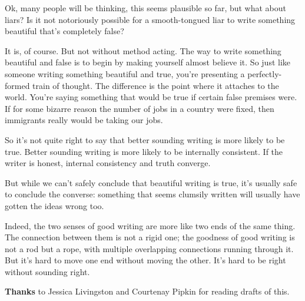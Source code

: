 Ok, many people will be thinking, this seems plausible so far, but what
about liars? Is it not notoriously possible for a smooth-tongued liar to
write something beautiful that's completely false?

It is, of course. But not without method acting. The way to write
something beautiful and false is to begin by making yourself almost
believe it. So just like someone writing something beautiful and true,
you're presenting a perfectly-formed train of thought. The difference is
the point where it attaches to the world. You're saying something that
would be true if certain false premises were. If for some bizarre reason
the number of jobs in a country were fixed, then immigrants really would
be taking our jobs.

So it's not quite right to say that better sounding writing is more
likely to be true. Better sounding writing is more likely to be
internally consistent. If the writer is honest, internal consistency and
truth converge.

But while we can't safely conclude that beautiful writing is true, it's
usually safe to conclude the converse: something that seems clumsily
written will usually have gotten the ideas wrong too.

Indeed, the two senses of good writing are more like two ends of the
same thing. The connection between them is not a rigid one; the goodness
of good writing is not a rod but a rope, with multiple overlapping
connections running through it. But it's hard to move one end without
moving the other. It's hard to be right without sounding right.


\textbf{Thanks} to Jessica Livingston and Courtenay Pipkin for reading
drafts of this.